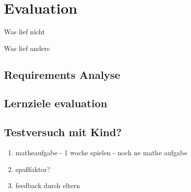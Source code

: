 \section{Evaluation}
	Was lief nicht

	Was lief anders
\subsection{Requirements Analyse}
\subsection{Lernziele evaluation}
\subsection{Testversuch mit Kind?}
	\begin{enumerate}
		\item{ matheaufgabe - 1 woche spielen - noch ne mathe aufgabe }
		\item{ spaßfaktor? }
		\item{ feedback durch eltern }
	\end{enumerate}
